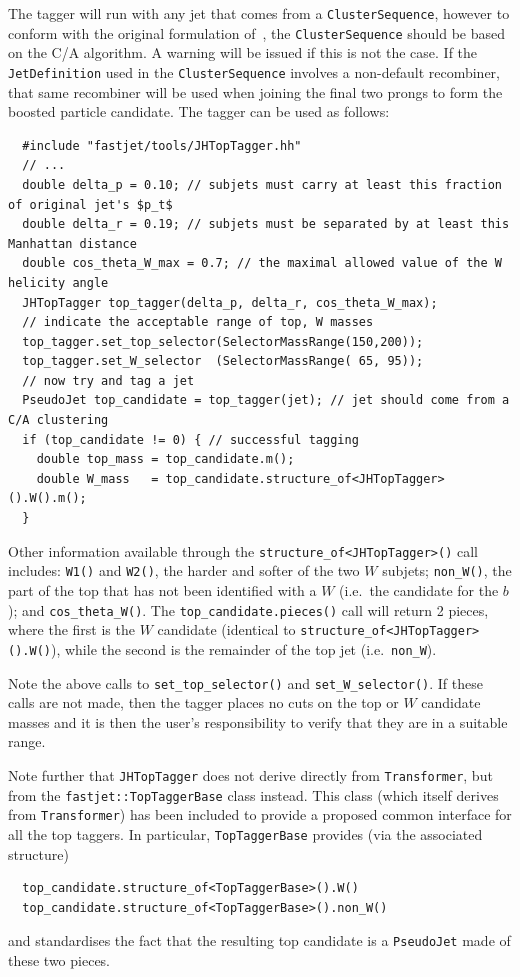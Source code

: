\documentclass[12pt,a4]{article}
\newcommand{\ttt}[1]{{\small\texttt{#1}}}
\newcommand{\CS}{\ttt{ClusterSequence}\xspace}
\begin{document}
%
The tagger will run with any jet that comes from a \CS, however
%
to conform with the original formulation of~\cite{Kaplan:2008ie}, the
\CS should be based on the C/A algorithm. A warning will be issued if
this is not the case.
%
If the \ttt{JetDefinition} used in the \CS involves a non-default
recombiner, that same recombiner will be used when joining the final
two prongs to form the boosted particle candidate.
%
The tagger can be used as follows:
\begin{lstlisting}
  #include "fastjet/tools/JHTopTagger.hh"
  // ...
  double delta_p = 0.10; // subjets must carry at least this fraction of original jet's $p_t$
  double delta_r = 0.19; // subjets must be separated by at least this Manhattan distance
  double cos_theta_W_max = 0.7; // the maximal allowed value of the W helicity angle
  JHTopTagger top_tagger(delta_p, delta_r, cos_theta_W_max);
  // indicate the acceptable range of top, W masses 
  top_tagger.set_top_selector(SelectorMassRange(150,200));
  top_tagger.set_W_selector  (SelectorMassRange( 65, 95));
  // now try and tag a jet
  PseudoJet top_candidate = top_tagger(jet); // jet should come from a C/A clustering
  if (top_candidate != 0) { // successful tagging
    double top_mass = top_candidate.m();
    double W_mass   = top_candidate.structure_of<JHTopTagger>().W().m();
  }
\end{lstlisting}
Other information available through the
\ttt{structure\_of<JHTopTagger>()} call includes: \ttt{W1()} and
\ttt{W2()}, the harder and softer of the two $W$ subjets;
\ttt{non\_W()}, the part of the top that has not been identified with
a $W$ (i.e.\ the candidate for the $b$); and \ttt{cos\_theta\_W()}.
%
The \ttt{top\_candidate.pieces()} call will return 2 pieces, where the
first is the $W$ candidate (identical to
\ttt{structure\_of<JHTopTagger>().W()}), while the second is the
remainder of the top jet (i.e.\ \ttt{non\_W}).
%

Note the above calls to \ttt{set\_top\_selector()} and
\ttt{set\_W\_selector()}. If these calls are not made, then the tagger
places no cuts on the top or $W$ candidate masses and it is then the
user's responsibility to verify that they are in a suitable range.

Note further that  \ttt{JHTopTagger} does not derive directly from 
\ttt{Transformer}, but from the
\ttt{fastjet::TopTaggerBase} class instead. This class (which itself derives
from \ttt{Transformer}) has been included to provide a proposed common
interface for all the top taggers. In particular, \ttt{TopTaggerBase} provides
(via the associated structure)
\begin{lstlisting}
  top_candidate.structure_of<TopTaggerBase>().W()
  top_candidate.structure_of<TopTaggerBase>().non_W()
\end{lstlisting}
and standardises the fact that the resulting top candidate is a \ttt{PseudoJet}
made of these two pieces.
\end{document}
